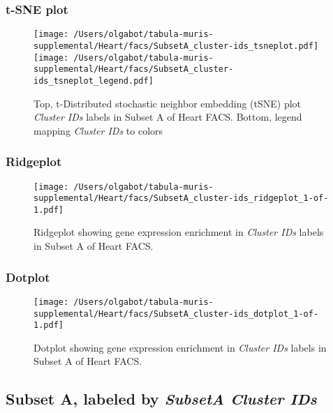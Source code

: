 \clearpage
\subsubsection{t-SNE plot}
\begin{figure}[h]
\centering
\texttt{[image: /Users/olgabot/tabula-muris-supplemental/Heart/facs/SubsetA\_cluster-ids\_tsneplot.pdf]}
\texttt{[image: /Users/olgabot/tabula-muris-supplemental/Heart/facs/SubsetA\_cluster-ids\_tsneplot\_legend.pdf]}
\caption{Top, t-Distributed stochastic neighbor embedding (tSNE) plot  \emph{Cluster IDs} labels in Subset A of Heart FACS. Bottom, legend mapping \emph{Cluster IDs} to colors}
\end{figure}


\clearpage

\subsubsection{Ridgeplot}
\begin{figure}[h]
\centering
\texttt{[image: /Users/olgabot/tabula-muris-supplemental/Heart/facs/SubsetA\_cluster-ids\_ridgeplot\_1-of-1.pdf]}

\caption{ Ridgeplot  showing gene expression enrichment in \emph{Cluster IDs} labels in Subset A of Heart FACS. }
\end{figure}


\clearpage

\subsubsection{Dotplot}
\begin{figure}[h]
\centering
\texttt{[image: /Users/olgabot/tabula-muris-supplemental/Heart/facs/SubsetA\_cluster-ids\_dotplot\_1-of-1.pdf]}

\caption{ Dotplot  showing gene expression enrichment in \emph{Cluster IDs} labels in Subset A of Heart FACS. }
\end{figure}


\clearpage

\subsection{Subset A, labeled by \emph{SubsetA Cluster IDs}}
